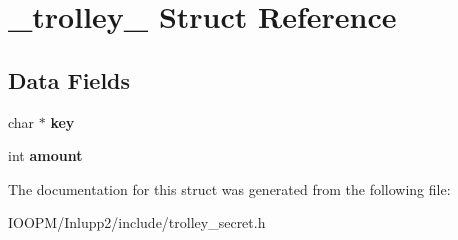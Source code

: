 \hypertarget{struct__trolley__}{}\section{\+\_\+trolley\+\_\+ Struct Reference}
\label{struct__trolley__}
\subsection*{Data Fields}
\begin{DoxyCompactItemize}
\item 
\hypertarget{struct__trolley___a5892a9181e6a332f84d27aecd41dcd12}{}char $\ast$ {\bfseries key}\label{struct__trolley___a5892a9181e6a332f84d27aecd41dcd12}

\item 
\hypertarget{struct__trolley___a14236de313193a14b4dbdf442bcf2bb9}{}int {\bfseries amount}\label{struct__trolley___a14236de313193a14b4dbdf442bcf2bb9}

\end{DoxyCompactItemize}


The documentation for this struct was generated from the following file\+:\begin{DoxyCompactItemize}
\item 
I\+O\+O\+P\+M/\+Inlupp2/include/trolley\+\_\+secret.\+h\end{DoxyCompactItemize}
